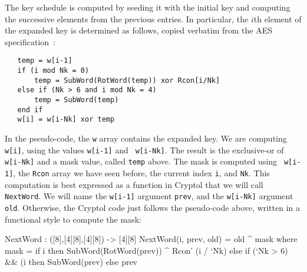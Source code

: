 The key schedule is computed by seeding it with the initial key and
computing the successive elements from the previous entries.  In
particular, the $i$th element of the expanded key is determined as
follows, copied verbatim from the AES\indAES
specification~\cite[Figure 11; Section 5.2]{aes}:
\begin{Verbatim}
   temp = w[i-1]
   if (i mod Nk = 0)
       temp = SubWord(RotWord(temp)) xor Rcon[i/Nk]
   else if (Nk > 6 and i mod Nk = 4)
       temp = SubWord(temp)
   end if
   w[i] = w[i-Nk] xor temp
\end{Verbatim}
In the pseudo-code, the {\tt w} array contains the expanded key. We
are computing {\tt w[i]}, using the values {\tt w[i-1]} and {\tt
  w[i-Nk]}.  The result is the exclusive-or of {\tt w[i-Nk]} and a
mask value, called {\tt temp} above. The mask is computed using {\tt
  w[i-1]}, the {\tt Rcon} array we have seen before, the current index
{\tt i}, and {\tt Nk}.  This computation is best expressed as a
function in Cryptol that we will call {\tt NextWord}.  We will name
the {\tt w[i-1]} argument {\tt prev}, and the {\tt w[i-Nk]} argument
{\tt old}. Otherwise, the Cryptol code just follows the pseudo-code
above, written in a functional style to compute the mask:
\begin{code}
  NextWord : ([8],[4][8],[4][8]) -> [4][8]
  NextWord(i, prev, old) = old ^ mask
     where mask = if i %
                  then SubWord(RotWord(prev)) ^ Rcon' (i / `Nk)
                  else if (`Nk > 6) && (i %
                       then SubWord(prev)
                       else prev
\end{code}

